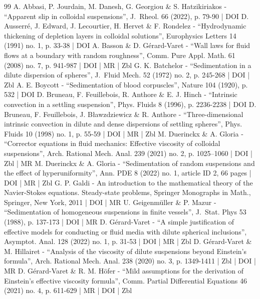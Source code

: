 \begin{thebibliography}{99}
A. Abbasi, P. Jourdain, M. Danesh, G. Georgiou \& S. Hatzikiriakos - “Apparent slip in colloidal suspensions”, J. Rheol. 66 (2022), p. 79-90 | DOI
D. Ausserré, J. Edward, J. Lecourtier, H. Hervet \& F. Rondelez - “Hydrodynamic thickening of depletion layers in colloidal solutions”, Europhysics Letters 14 (1991) no. 1, p. 33-38 | DOI
A. Basson \& D. Gérard-Varet - “Wall laws for fluid flows at a boundary with random roughness”, Comm. Pure Appl. Math. 61 (2008) no. 7, p. 941-987 | DOI | MR | Zbl
G. K. Batchelor - “Sedimentation in a dilute dispersion of spheres”, J. Fluid Mech. 52 (1972) no. 2, p. 245-268 | DOI | Zbl
A. E. Boycott - “Sedimentation of blood corpuscles”, Nature 104 (1920), p. 532 | DOI
D. Bruneau, F. Feuillebois, R. Anthore \& E. J. Hinch - “Intrinsic convection in a settling suspension”, Phys. Fluids 8 (1996), p. 2236-2238 | DOI
D. Bruneau, F. Feuillebois, J. Bławzdziewicz \& R. Anthore - “Three-dimensional intrinsic convection in dilute and dense dispersions of settling spheres”, Phys. Fluids 10 (1998) no. 1, p. 55-59 | DOI | MR | Zbl
M. Duerinckx \& A. Gloria - “Corrector equations in fluid mechanics: Effective viscosity of colloidal suspensions”, Arch. Rational Mech. Anal. 239 (2021) no. 2, p. 1025–1060 | DOI | Zbl | MR
M. Duerinckx \& A. Gloria - “Sedimentation of random suspensions and the effect of hyperuniformity”, Ann. PDE 8 (2022) no. 1, article ID 2, 66 pages | DOI | MR | Zbl
G. P. Galdi - An introduction to the mathematical theory of the Navier-Stokes equations. Steady-state problems, Springer Monographs in Math., Springer, New York, 2011 | DOI | MR
U. Geigenmüller \& P. Mazur - “Sedimentation of homogeneous suspensions in finite vessels”, J. Stat. Phys 53 (1988), p. 137-173 | DOI | MR
D. Gérard-Varet - “A simple justification of effective models for conducting or fluid media with dilute spherical inclusions”, Asymptot. Anal. 128 (2022) no. 1, p. 31-53 | DOI | MR | Zbl
D. Gérard-Varet \& M. Hillairet - “Analysis of the viscosity of dilute suspensions beyond Einstein’s formula”, Arch. Rational Mech. Anal. 238 (2020) no. 3, p. 1349-1411 | Zbl | DOI | MR
D. Gérard-Varet \& R. M. Höfer - “Mild assumptions for the derivation of Einstein’s effective viscosity formula”, Comm. Partial Differential Equations 46 (2021) no. 4, p. 611-629 | MR | DOI | Zbl

\end{thebibliography}
